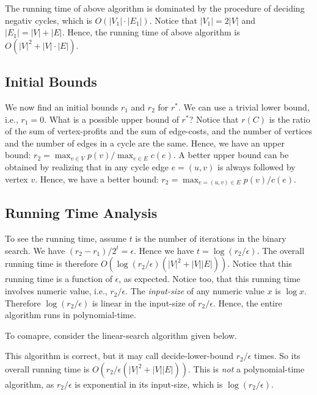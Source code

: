 The running time of above algorithm is dominated by the procedure of deciding negativ cycles, which is $O(|V_1|\cdot |E_1|)$.
Notice that $|V_1| = 2|V|$ and $|E_1| = |V| + |E|$. Hence, the running time of above algorithm is $O(|V|^2 + |V| \cdot |E|)$.


\subsection*{Initial Bounds}

We now find an initial bounds $r_1$ and $r_2$ for $r^*$.
We can use a trivial lower bound, i.e., $r_1 = 0$.
What is a possible upper bound of $r^*$?
Notice that $r(C)$ is the ratio of the sum of vertex-profits and the sum of edge-costs,
and the number of vertices and the number of edges in a cycle are the same.
Hence, we have an upper bound: $r_2 = \max_{v\in V} p(v) / \max_{e\in E} c(e)$.
A better upper bound can be obtained by realizing that in any cycle edge $e = (u,v)$ is always followed by vertex $v$.
Hence, we have a better bound: $r_2 = \max_{e = (u,v) \in E} p(v) / c(e)$.

\subsection*{Running Time Analysis}

To see the running time, assume $t$ is the number of iterations in the binary search.
We have $(r_2 - r_1) / 2^t = \epsilon$. Hence we have $t = \log (r_2 / \epsilon)$.
The overall running time is therefore $O(\log (r_2 / \epsilon) (|V|^2 + |V||E|))$.
Notice that this running time is a function of $\epsilon$, as expected.
Notice too, that this running time involves numeric value, i.e., $r_2 / \epsilon$.
The \emph{input-size} of any numeric value $x$ is $\log x$.
Therefore $\log(r_2 / \epsilon)$ is linear in the input-size of $r_2/\epsilon$.
Hence, the entire algorithm runs in polynomial-time.

To comapre, consider the linear-search algorithm given below.

\begin{minipage}{0.8\textwidth}
	\xxx
	\xxx
	\xxx
	\xxx
	\aab {else: return $(r - \epsilon, r]$;}\xxx
	\xxx
\end{minipage}

This algorithm is correct, but it may call decide-lower-bound $r_2 / \epsilon$ times.
So its overall running time is $O(r_2 / \epsilon (|V|^2 + |V||E|))$.
This is \emph{not} a polynomial-time algorithm,
as $r_2 / \epsilon$ is exponential in its input-size, which is $\log(r_2/\epsilon)$.

